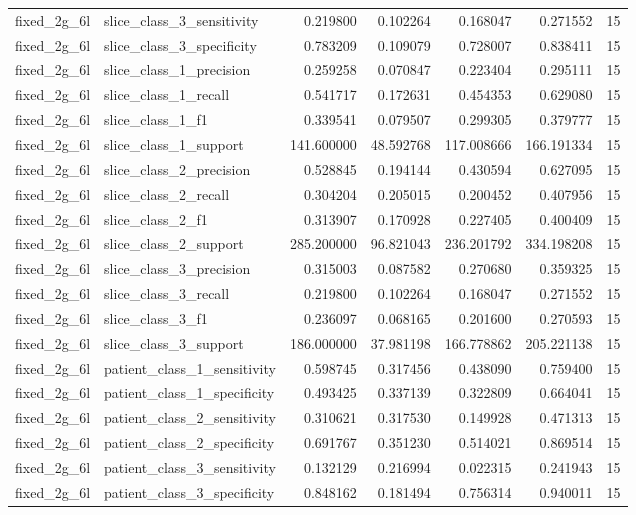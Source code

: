 \begin{tabular}{llrrrrr}
fixed_2g_6l & slice_class_3_sensitivity & 0.219800 & 0.102264 & 0.168047 & 0.271552 & 15 \\
fixed_2g_6l & slice_class_3_specificity & 0.783209 & 0.109079 & 0.728007 & 0.838411 & 15 \\
fixed_2g_6l & slice_class_1_precision & 0.259258 & 0.070847 & 0.223404 & 0.295111 & 15 \\
fixed_2g_6l & slice_class_1_recall & 0.541717 & 0.172631 & 0.454353 & 0.629080 & 15 \\
fixed_2g_6l & slice_class_1_f1 & 0.339541 & 0.079507 & 0.299305 & 0.379777 & 15 \\
fixed_2g_6l & slice_class_1_support & 141.600000 & 48.592768 & 117.008666 & 166.191334 & 15 \\
fixed_2g_6l & slice_class_2_precision & 0.528845 & 0.194144 & 0.430594 & 0.627095 & 15 \\
fixed_2g_6l & slice_class_2_recall & 0.304204 & 0.205015 & 0.200452 & 0.407956 & 15 \\
fixed_2g_6l & slice_class_2_f1 & 0.313907 & 0.170928 & 0.227405 & 0.400409 & 15 \\
fixed_2g_6l & slice_class_2_support & 285.200000 & 96.821043 & 236.201792 & 334.198208 & 15 \\
fixed_2g_6l & slice_class_3_precision & 0.315003 & 0.087582 & 0.270680 & 0.359325 & 15 \\
fixed_2g_6l & slice_class_3_recall & 0.219800 & 0.102264 & 0.168047 & 0.271552 & 15 \\
fixed_2g_6l & slice_class_3_f1 & 0.236097 & 0.068165 & 0.201600 & 0.270593 & 15 \\
fixed_2g_6l & slice_class_3_support & 186.000000 & 37.981198 & 166.778862 & 205.221138 & 15 \\
fixed_2g_6l & patient_class_1_sensitivity & 0.598745 & 0.317456 & 0.438090 & 0.759400 & 15 \\
fixed_2g_6l & patient_class_1_specificity & 0.493425 & 0.337139 & 0.322809 & 0.664041 & 15 \\
fixed_2g_6l & patient_class_2_sensitivity & 0.310621 & 0.317530 & 0.149928 & 0.471313 & 15 \\
fixed_2g_6l & patient_class_2_specificity & 0.691767 & 0.351230 & 0.514021 & 0.869514 & 15 \\
fixed_2g_6l & patient_class_3_sensitivity & 0.132129 & 0.216994 & 0.022315 & 0.241943 & 15 \\
fixed_2g_6l & patient_class_3_specificity & 0.848162 & 0.181494 & 0.756314 & 0.940011 & 15 \\

\end{tabular}
